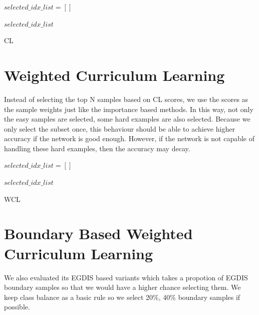 \begin{algorithm}[H]

$selected\_idx\_list = []$ \;



\Return $selected\_idx\_list$ \;

\caption{CL}
\end{algorithm}

\section{Weighted Curriculum Learning}
Instead of selecting the top N samples based on CL scores, we use the scores as the sample weights just like the importance based methods. In this way, not only the easy samples are selected, some hard examples are also selected. Because we only select the subset once, this behaviour should be able to achieve higher accuracy if the network is good enough. However, if the network is not capable of handling these hard examples, then the accuracy may decay.



\begin{algorithm}[H]

$selected\_idx\_list = []$ \;



\Return $selected\_idx\_list$ \;

\caption{WCL}
\end{algorithm}

\section{Boundary Based Weighted Curriculum Learning}
We also evaluated its EGDIS based variants which takes a propotion of EGDIS boundary samples so that we would have a higher chance selecting them. We keep class balance as a basic rule so we select 20\%, 40\% boundary samples if possible.

